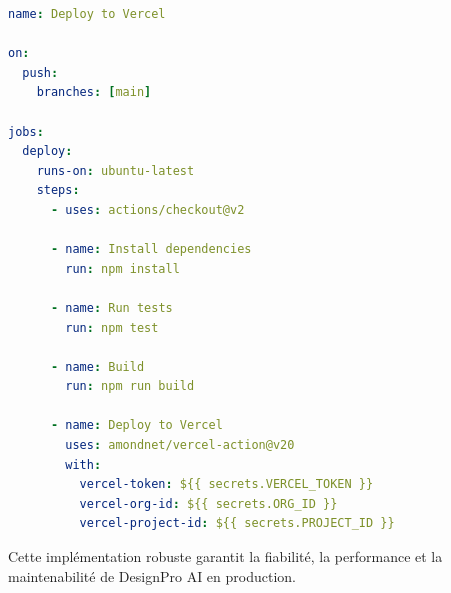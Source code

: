 \begin{lstlisting}[language=YAML, caption=.github/workflows/deploy.yml]
name: Deploy to Vercel

on:
  push:
    branches: [main]

jobs:
  deploy:
    runs-on: ubuntu-latest
    steps:
      - uses: actions/checkout@v2
      
      - name: Install dependencies
        run: npm install
      
      - name: Run tests
        run: npm test
      
      - name: Build
        run: npm run build
      
      - name: Deploy to Vercel
        uses: amondnet/vercel-action@v20
        with:
          vercel-token: ${{ secrets.VERCEL_TOKEN }}
          vercel-org-id: ${{ secrets.ORG_ID }}
          vercel-project-id: ${{ secrets.PROJECT_ID }}
\end{lstlisting}

Cette implémentation robuste garantit la fiabilité, la performance et la maintenabilité de DesignPro AI en production.

